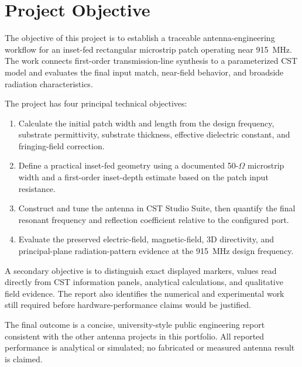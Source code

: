 \chapter*{Project Objective}
\thispagestyle{fancy}
\begingroup
\setlength{\emergencystretch}{2em}

The objective of this project is to establish a traceable antenna-engineering workflow
for an inset-fed rectangular microstrip patch operating near 915~MHz. The work connects
first-order transmission-line synthesis to a parameterized CST model and evaluates the
final input match, near-field behavior, and broadside radiation characteristics.

The project has four principal technical objectives:

\begin{enumerate}
    \item Calculate the initial patch width and length from the design frequency,
    substrate permittivity, substrate thickness, effective dielectric constant, and
    fringing-field correction.

    \item Define a practical inset-fed geometry using a documented 50-$\Omega$
    microstrip width and a first-order inset-depth estimate based on the patch input
    resistance.

    \item Construct and tune the antenna in CST Studio Suite, then quantify the final
    resonant frequency and reflection coefficient relative to the configured port.

    \item Evaluate the preserved electric-field, magnetic-field, 3D directivity, and
    principal-plane radiation-pattern evidence at the 915~MHz design frequency.
\end{enumerate}

A secondary objective is to distinguish exact displayed markers, values read directly
from CST information panels, analytical calculations, and qualitative field evidence.
The report also identifies the numerical and experimental work still required before
hardware-performance claims would be justified.

The final outcome is a concise, university-style public engineering report consistent
with the other antenna projects in this portfolio. All reported performance is
analytical or simulated; no fabricated or measured antenna result is claimed.
\endgroup
